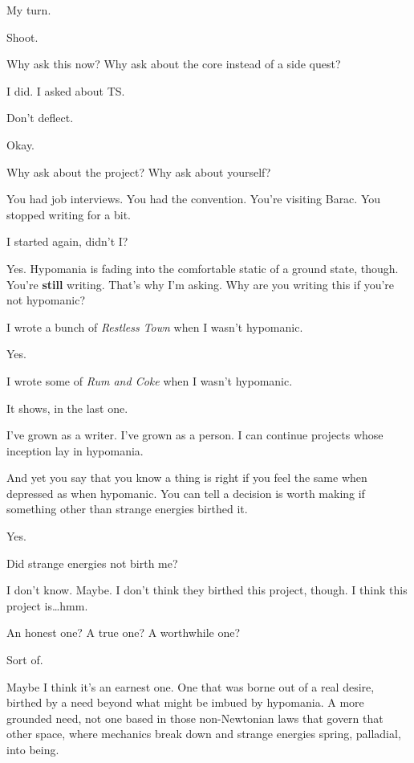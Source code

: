 \noindent My turn.

\begin{ally}
Shoot.
\end{ally}
Why ask this now? Why ask about the core instead of a side quest?

\begin{ally}
I did. I asked about TS.
\end{ally}
Don't deflect.

\begin{ally}
Okay.
\end{ally}
Why ask about the project? Why ask about yourself?

\begin{ally}
You had job interviews. You had the convention. You're visiting Barac. You stopped writing for a bit.
\end{ally}
I started again, didn't I?

\begin{ally}
Yes. Hypomania is fading into the comfortable static of a ground state, though. You're \textbf{still} writing. That's why I'm asking. Why are you writing this if you're not hypomanic?
\end{ally}
I wrote a bunch of \emph{Restless Town} when I wasn't hypomanic.

\begin{ally}
Yes.
\end{ally}
I wrote some of \emph{Rum and Coke} when I wasn't hypomanic.

\begin{ally}
It shows, in the last one.
\end{ally}
I've grown as a writer. I've grown as a person. I can continue projects whose inception lay in hypomania.

\begin{ally}
And yet you say that you know a thing is right if you feel the same when depressed as when hypomanic. You can tell a decision is worth making if something other than strange energies birthed it.
\end{ally}
Yes.

\begin{ally}
Did strange energies not birth me?
\end{ally}
I don't know. Maybe. I don't think they birthed this project, though. I think this project is\ldots{}hmm.

\begin{ally}
An honest one? A true one? A worthwhile one?
\end{ally}
Sort of.

Maybe I think it's an earnest one. One that was borne out of a real desire, birthed by a need beyond what might be imbued by hypomania. A more grounded need, not one based in those non-Newtonian laws that govern that other space, where mechanics break down and strange energies spring, palladial, into being.
